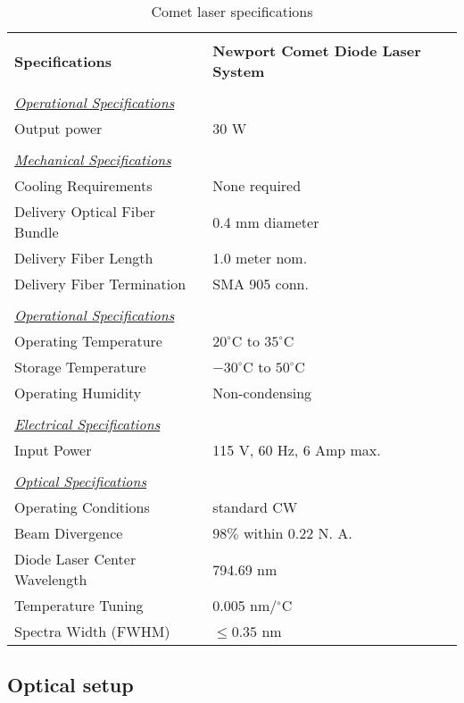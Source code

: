 {\begin{table}
\begin{center}
\begin{tabular}{|l|l|}
\hline
& \\
{\bf Specifications}&{\bf Newport Comet Diode Laser System} \\
\hline
& \\
\underline {\it Operational Specifications}& \\
Output power			& 30 W \\
& \\
\underline {\it Mechanical Specifications}& \\
Cooling Requirements 		& None required \\
Delivery Optical Fiber Bundle   & 0.4 mm diameter \\
Delivery Fiber Length		& 1.0 meter nom.\\
Delivery Fiber Termination	& SMA 905 conn. \\
& \\
\underline {\it Operational Specifications}& \\
Operating Temperature   & $20^\circ$C to $35^\circ$C \\
Storage Temperature     & $-30^\circ$C to $50^\circ$C \\
Operating Humidity        & Non-condensing  \\
& \\
\underline {\it Electrical Specifications}& \\
Input Power	                & 115 V, 60 Hz, 6 Amp max. \\
& \\
\underline {\it Optical Specifications}& \\
Operating Conditions 		& standard CW \\
Beam Divergence        & $98\%$ within 0.22 N. A. \\
Diode Laser Center Wavelength   & 794.69 nm \\
Temperature Tuning	& 0.005 nm/$^\circ$C \\
Spectra Width (FWHM)       & $\le 0.35$ nm \\
\hline
\end{tabular}
\label{tab:Comet}
\caption{Comet laser specifications}
\end{center}
\end{table}

\subsection{Optical setup}

}
